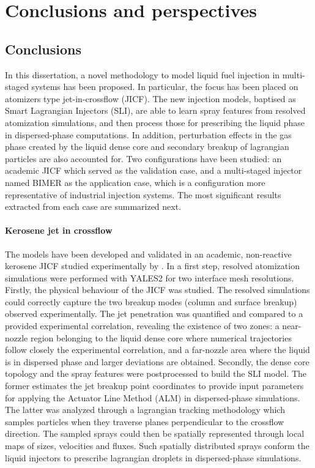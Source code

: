 \chapter{Conclusions and perspectives}

\section*{Conclusions}

In this dissertation, a novel methodology to model liquid fuel injection in multi-staged systems has been proposed. In particular, the focus has been placed on atomizers type jet-in-crossflow (JICF). The new injection models, baptised as Smart Lagrangian Injectors (SLI), are able to learn spray features from resolved atomization simulations, and then process those for prescribing the liquid phase in dispersed-phase computations. In addition, perturbation effects in the gas phase created by the liquid dense core and secondary breakup of lagrangian particles are also accounted for. Two configurations have been studied: an academic JICF which served as the validation case, and a multi-staged injector named BIMER as the application case, which is a configuration more representative of industrial injection systems. The most significant results extracted from each case are summarized next.


\subsubsection*{Kerosene jet in crossflow}

The models have been developed and validated in an academic, non-reactive kerosene JICF studied experimentally by . In a first step, resolved atomization simulations were performed with YALES2 for two interface mesh resolutions. Firstly, the physical behaviour of the JICF was studied. The resolved simulations could correctly capture the two breakup modes (column and surface breakup) observed experimentally.  The jet penetration was quantified and compared to a provided experimental correlation, revealing the existence of two zones: a near-nozzle region belonging to the liquid dense core where numerical trajectories follow closely the experimental correlation, and a far-nozzle area where the liquid is in dispersed phase and larger deviations are obtained. Secondly, the dense core topology and the spray features were postprocessed to build the SLI model. The former estimates the jet breakup point coordinates to provide input parameters for applying the Actuator Line Method (ALM) in dispersed-phase simulations. The latter was analyzed through a lagrangian tracking methodology which samples particles when they traverse planes perpendicular to the crossflow direction. The sampled sprays could then be spatially represented through local maps of sizes, velocities and fluxes. Such spatially distributed sprays conform the liquid injectors to prescribe lagrangian droplets in dispersed-phase simulations. \\

